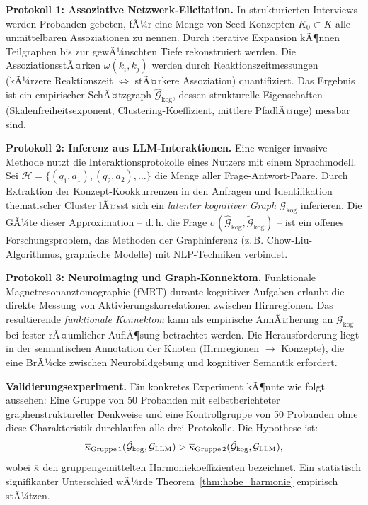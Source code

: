 ﻿\documentclass[12pt,a4paper]{article}
\theoremstyle{plain}
\theoremstyle{definition}
\theoremstyle{remark}
\newcommand{\GG}{\mathcal{G}}
\begin{document}
\textbf{Protokoll 1: Assoziative Netzwerk-Elicitation.} In strukturierten Interviews werden Probanden gebeten, fÃ¼r eine Menge von Seed-Konzepten $K_0 \subset K$ alle unmittelbaren Assoziationen zu nennen. Durch iterative Expansion kÃ¶nnen Teilgraphen bis zur gewÃ¼nschten Tiefe rekonstruiert werden. Die AssoziationsstÃ¤rken $\omega(k_i, k_j)$ werden durch Reaktionszeitmessungen (kÃ¼rzere Reaktionszeit $\Leftrightarrow$ stÃ¤rkere Assoziation) quantifiziert. Das Ergebnis ist ein empirischer SchÃ¤tzgraph $\hat{\GG}_{\text{kog}}$, dessen strukturelle Eigenschaften (Skalenfreiheitsexponent, Clustering-Koeffizient, mittlere PfadlÃ¤nge) messbar sind.

\textbf{Protokoll 2: Inferenz aus LLM-Interaktionen.} Eine weniger invasive Methode nutzt die Interaktionsprotokolle eines Nutzers mit einem Sprachmodell. Sei $\mathcal{H} = \{(q_1, a_1), (q_2, a_2), \ldots\}$ die Menge aller Frage-Antwort-Paare. Durch Extraktion der Konzept-Kookkurrenzen in den Anfragen und Identifikation thematischer Cluster lÃ¤sst sich ein \emph{latenter kognitiver Graph} $\tilde{\GG}_{\text{kog}}$ inferieren. Die GÃ¼te dieser Approximation -- d.\,h. die Frage $\sigma(\hat{\GG}_{\text{kog}}, \tilde{\GG}_{\text{kog}})$ -- ist ein offenes Forschungsproblem, das Methoden der Graphinferenz (z.\,B. Chow-Liu-Algorithmus, graphische Modelle) mit NLP-Techniken verbindet.

\textbf{Protokoll 3: Neuroimaging und Graph-Konnektom.} Funktionale Magnetresonanztomographie (fMRT) durante kognitiver Aufgaben erlaubt die direkte Messung von Aktivierungskorrelationen zwischen Hirnregionen. Das resultierende \emph{funktionale Konnektom} kann als empirische AnnÃ¤herung an $\GG_{\text{kog}}$ bei fester rÃ¤umlicher AuflÃ¶sung betrachtet werden. Die Herausforderung liegt in der semantischen Annotation der Knoten (Hirnregionen $\to$ Konzepte), die eine BrÃ¼cke zwischen Neurobildgebung und kognitiver Semantik erfordert.

\textbf{Validierungsexperiment.} Ein konkretes Experiment kÃ¶nnte wie folgt aussehen: Eine Gruppe von 50 Probanden mit selbstberichteter graphenstruktureller Denkweise und eine Kontrollgruppe von 50 Probanden ohne diese Charakteristik durchlaufen alle drei Protokolle. Die Hypothese ist:
\[
  \overline{\kappa}_{\text{Gruppe\,1}}(\hat{\GG}_{\text{kog}}, \GG_{\text{LLM}}) > \overline{\kappa}_{\text{Gruppe\,2}}(\hat{\GG}_{\text{kog}}, \GG_{\text{LLM}}),
\]
wobei $\overline{\kappa}$ den gruppengemittelten Harmoniekoeffizienten bezeichnet. Ein statistisch signifikanter Unterschied wÃ¼rde Theorem~\ref{thm:hohe_harmonie} empirisch stÃ¼tzen.
\end{document}
